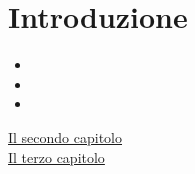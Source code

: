 \chapter{Introduzione}\label{ch:intro}

\lipsum[1]

\begin{itemize}
\item \MakeTextLowercase{\lipsum[1][1]}
\item \MakeTextLowercase{\lipsum[1][2]}
\item \MakeTextLowercase{\lipsum[1][3]}
\end{itemize}

\lipsum[2-3]\par\bigskip

\lipsum[1][1]
\begin{description}
\item[{\hyperref[ch:chap-name]{Il secondo capitolo}}] \lipsum[1][1-2]
\item[{\hyperref[ch:concl]{Il terzo capitolo}}] \lipsum[1][2-3]
\end{description}

